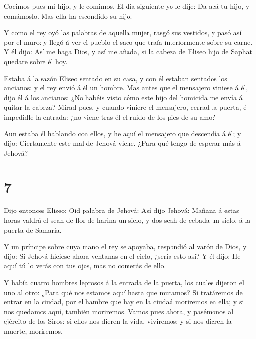  Cocimos pues mi hijo, y le comimos. El día siguiente yo le
dije: Da acá tu hijo, y comámoslo. Mas ella ha escondido su hijo.

 Y como el rey oyó las palabras de aquella mujer, rasgó sus
vestidos, y pasó así por el muro: y llegó á ver el pueblo el saco que
traía interiormente sobre su carne.  Y él dijo: Así me haga
Dios, y así me añada, si la cabeza de Eliseo hijo de Saphat quedare
sobre él hoy.

 Estaba á la sazón Eliseo sentado en su casa, y con él
estaban sentados los ancianos: y el rey envió á él un hombre. Mas antes
que el mensajero viniese á él, dijo él á los ancianos: ¿No habéis visto
cómo este hijo del homicida me envía á quitar la cabeza? Mirad pues, y
cuando viniere el mensajero, cerrad la puerta, é impedidle la entrada:
¿no viene tras él el ruido de los pies de su amo?

 Aun estaba él hablando con ellos, y he aquí el mensajero
que descendía á él; y dijo: Ciertamente este mal de Jehová viene. ¿Para
qué tengo de esperar más á Jehová?

\hypertarget{section-6}{%
\section{7}\label{section-6}}

 Dijo entonces Eliseo: Oid palabra de Jehová: Así dijo
Jehová: Mañana á estas horas valdrá el seah de flor de harina un siclo,
y dos seah de cebada un siclo, á la puerta de Samaria.

 Y un príncipe sobre cuya mano el rey se apoyaba, respondió
al varón de Dios, y dijo: Si Jehová hiciese ahora ventanas en el cielo,
¿sería esto así? Y él dijo: He aquí tú lo verás con tus ojos, mas no
comerás de ello.

 Y había cuatro hombres leprosos á la entrada de la puerta,
los cuales dijeron el uno al otro: ¿Para qué nos estamos aquí hasta que
muramos?  Si tratáremos de entrar en la ciudad, por el
hambre que hay en la ciudad moriremos en ella; y si nos quedamos aquí,
también moriremos. Vamos pues ahora, y pasémonos al ejército de los
Siros: si ellos nos dieren la vida, viviremos; y si nos dieren la
muerte, moriremos.


